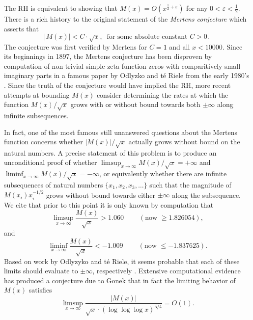 \documentclass[11pt,reqno,a4letter]{article}
\numberwithin{figure}{section}
\numberwithin{table}{section}
\newcommand{\cf}{\textit{cf.\ }}
\newcommand{\seqnum}[1]{\href{http://oeis.org/#1}{\color{ProcessBlue}{\underline{#1}}}}
\theoremstyle{plain}
\numberwithin{theorem}{section}
\theoremstyle{definition}
\begin{document}
The RH is equivalent to showing that 
$M(x) = O\left(x^{\frac{1}{2}+\varepsilon}\right)$ for any 
$0 < \varepsilon < \frac{1}{2}$. 
There is a rich history to the original statement of the \emph{Mertens conjecture} which 
asserts that 
\[ 
|M(x)| < C \cdot \sqrt{x},\ \text{ for some absolute constant $C > 0$. }
\] 
The conjecture was first verified by Mertens for $C = 1$ and all $x < 10000$. 
Since its beginnings in 1897, the Mertens conjecture has been disproven by computation 
of non-trivial simple zeta function zeros with comparitively small imaginary parts in a famous paper by 
Odlyzko and t\'{e} Riele from the early 1980's \cite{ODLYZ-TRIELE}. 
Since the truth of the conjecture would have implied the RH, more recent attempts 
at bounding $M(x)$ consider determining the rates at which the function 
$M(x) / \sqrt{x}$ grows with or without bound towards both $\pm \infty$ along infinite 
subsequences. 

In fact, one of the most famous still unanswered questions about the Mertens 
function concerns whether $|M(x)| / \sqrt{x}$ actually grows without bound on the 
natural numbers. A precise statement of this 
problem is to produce an unconditional proof of whether 
$\limsup_{x \rightarrow \infty} M(x) / \sqrt{x} = +\infty$ and 
$\liminf_{x \rightarrow \infty} M(x) / \sqrt{x} = -\infty$, or 
equivalently whether there are infinite subsequences of natural numbers 
$\{x_1, x_2, x_3, \ldots\}$ such that the magnitude of 
$M(x_i) x_i^{-1/2}$ grows without bound towards either $\pm \infty$ 
along the subsequence. 
We cite that prior to this point it is only known by computation 
that \cite[\cf \S 4.1]{PRIMEREC} 
\cite[\cf \seqnum{A051400}; \seqnum{A051401}]{OEIS} 
\[
\limsup_{x\rightarrow\infty} \frac{M(x)}{\sqrt{x}} > 1.060\ \qquad (\text{now } \geq 1.826054), 
\] 
and 
\[ 
\liminf_{x\rightarrow\infty} \frac{M(x)}{\sqrt{x}} < -1.009\ \qquad (\text{now } \leq -1.837625). 
\] 
Based on work by Odlyzyko and t\'{e} Riele, it seems probable that 
each of these limits should evaluate to $\pm \infty$, respectively 
\cite{ODLYZ-TRIELE,MREVISITED,ORDER-MERTENSFN,HURST-2017}. 
Extensive computational evidence has produced 
a conjecture due to Gonek that in fact the limiting behavior of 
$M(x)$ satisfies \cite{NG-MERTENS}
$$\limsup_{x \rightarrow \infty} \frac{|M(x)|}{\sqrt{x} \cdot (\log\log\log x)^{5/4}} = O(1).$$ 
\end{document}
